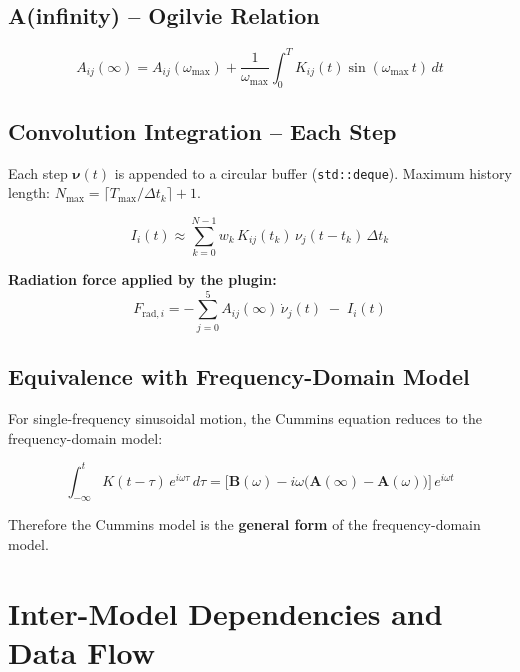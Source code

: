 \documentclass[12pt,a4paper]{article}
\newcommand{\nuvec}{\boldsymbol{\nu}}
\newcommand{\Avec}{\mathbf{A}}
\newcommand{\Bvec}{\mathbf{B}}
\newcommand{\Ainf}{\mathbf{A}(\infty)}
\begin{document}
\subsection{A(infinity) -- Ogilvie Relation}

\begin{equation}
  \boxed{
  A_{ij}(\infty)
    = A_{ij}(\omega_{\max})
    + \frac{1}{\omega_{\max}}
      \int_0^{T} K_{ij}(t)\sin(\omega_{\max}\,t)\,dt
  }
  \label{eq:a_inf}
\end{equation}

\subsection{Convolution Integration -- Each Step}

Each step $\nuvec(t)$ is appended to a circular buffer (\texttt{std::deque}).
Maximum history length: $N_{\max} = \lceil T_{\max}/\Delta t_k\rceil + 1$.

\begin{equation}
  I_i(t)
    \approx \sum_{k=0}^{N-1} w_k\,K_{ij}(t_k)\,\nu_j(t-t_k)\,\Delta t_k
  \label{eq:convolution}
\end{equation}

\textbf{Radiation force applied by the plugin:}
\begin{equation}
  \boxed{
  F_{\text{rad},i}
    = -\sum_{j=0}^{5} A_{ij}(\infty)\,\dot{\nu}_j(t)
    \;-\; I_i(t)
  }
  \label{eq:rad_force}
\end{equation}

\subsection{Equivalence with Frequency-Domain Model}

For single-frequency sinusoidal motion, the Cummins equation reduces to
the frequency-domain model:

\begin{equation}
  \int_{-\infty}^{t} K(t-\tau)\,e^{i\omega\tau}\,d\tau
    = \bigl[\Bvec(\omega)
       - i\omega\bigl(\Ainf - \Avec(\omega)\bigr)\bigr]\,e^{i\omega t}
  \label{eq:cummins_freq_equiv}
\end{equation}

Therefore the Cummins model is the \textbf{general form} of the
frequency-domain model.

\newpage
\section{Inter-Model Dependencies and Data Flow}
\end{document}
